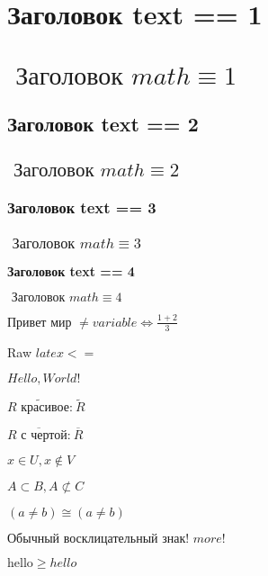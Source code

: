 \documentclass[12pt,a4paper]{scrartcl}
\def\t{\text}
\begin{document}
\section*{ Заголовок text == 1}

\section*{\(\text{ Заголовок }\allowbreak math \equiv  1\)}

\subsection*{ Заголовок text == 2}

\subsection*{\(\text{ Заголовок }\allowbreak math \equiv  2\)}

\subsubsection*{ Заголовок text == 3}

\subsubsection*{\(\text{ Заголовок }\allowbreak math \equiv  3\)}

\medskip\textbf{ Заголовок text == 4}\medskip

\medskip\textbf{\(\text{ Заголовок }\allowbreak math \equiv  4\)}\medskip

\(\text{Привет }\allowbreak \text{мир }\allowbreak \neq  variable \Leftrightarrow  \frac{1 + 2 }{ 3}\)

Raw $latex <=$


\(Hello, World!\)

\(\widetilde {R\text{ красивое:}\allowbreak }\ \widetilde R\)

\(\overline {R\text{ с }\allowbreak \text{чертой:}\allowbreak }\ \overline R\)

\(x \in U, x \not\in V\)

\(A \subset B, A \not\subset C\)

\((a \neq  b) \cong  (a \neq  b)\)

\(\text{Обычный }\allowbreak \text{восклицательный }\allowbreak \text{знак! }\allowbreak more!\)

\(\t{hello} \ge  hello\)
\end{document}
